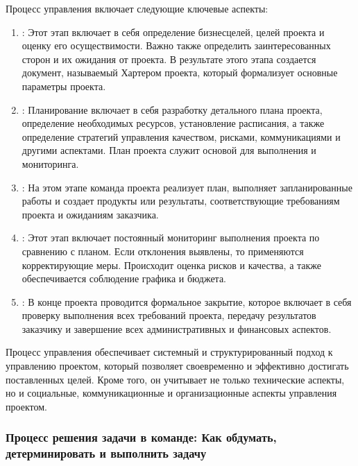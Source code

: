 \documentclass[letterpaper,10pt,russian]{sphinxmanual}
\begin{document}
\sphinxAtStartPar
Процесс управления включает следующие ключевые аспекты:
\begin{enumerate}
%
\item {} 
\sphinxAtStartPar
{}:
Этот этап включает в себя определение бизнес\sphinxhyphen{}целей, целей проекта и оценку его осуществимости. Важно также определить заинтересованных сторон и их ожидания от проекта. В результате этого этапа создается документ, называемый Хартером проекта, который формализует основные параметры проекта.

\item {} 
\sphinxAtStartPar
{}:
Планирование включает в себя разработку детального плана проекта, определение необходимых ресурсов, установление расписания, а также определение стратегий управления качеством, рисками, коммуникациями и другими аспектами. План проекта служит основой для выполнения и мониторинга.

\item {} 
\sphinxAtStartPar
{}:
На этом этапе команда проекта реализует план, выполняет запланированные работы и создает продукты или результаты, соответствующие требованиям проекта и ожиданиям заказчика.

\item {} 
\sphinxAtStartPar
{}:
Этот этап включает постоянный мониторинг выполнения проекта по сравнению с планом. Если отклонения выявлены, то применяются корректирующие меры. Происходит оценка рисков и качества, а также обеспечивается соблюдение графика и бюджета.

\item {} 
\sphinxAtStartPar
{}:
В конце проекта проводится формальное закрытие, которое включает в себя проверку выполнения всех требований проекта, передачу результатов заказчику и завершение всех административных и финансовых аспектов.

\end{enumerate}

\sphinxAtStartPar
Процесс управления обеспечивает системный и структурированный подход к управлению проектом, который позволяет своевременно и эффективно достигать поставленных целей. Кроме того, он учитывает не только технические аспекты, но и социальные, коммуникационные и организационные аспекты управления проектом.


\subsubsection{Процесс решения задачи в команде: Как обдумать, детерминировать и выполнить задачу}
\label{\detokenize{educational_materials/team_work_on_a_project/content:id12}}
\end{document}
